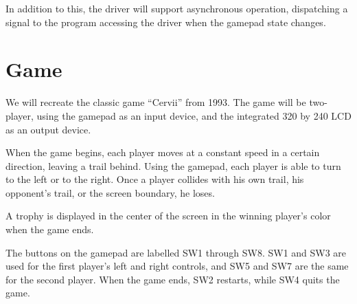 In addition to this, the driver will support asynchronous operation, dispatching a signal to the program accessing the driver when the gamepad state changes.

\section{Game}
We will recreate the classic game ``Cervii'' from 1993. The game will be two-player, using the gamepad as an input device, and the integrated 320 by 240 LCD as an output device.

When the game begins, each player moves at a constant speed in a certain direction, leaving a trail behind. Using the gamepad, each player is able to turn to the left or to the right. Once a player collides with his own trail, his opponent's trail, or the screen boundary, he loses.

A trophy is displayed in the center of the screen in the winning player's color when the game ends.

The buttons on the gamepad are labelled SW1 through SW8. SW1 and SW3 are used for the first player's left and right controls, and SW5 and SW7 are the same for the second player. When the game ends, SW2 restarts, while SW4 quits the game.